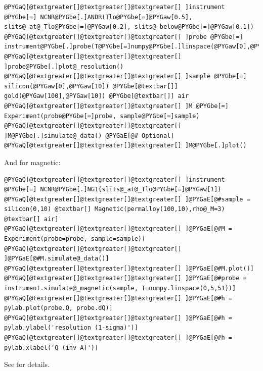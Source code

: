 \documentclass[letterpaper,10pt,english]{sphinxmanual}
\begin{document}
\begin{Verbatim}[commandchars=@\[\]]
@PYGaQ[@textgreater[]@textgreater[]@textgreater[] ]instrument @PYGbe[=] NCNR@PYGbe[.]ANDR(Tlo@PYGbe[=]@PYGaw[0.5], slits@_at@_Tlo@PYGbe[=]@PYGaw[0.2], slits@_below@PYGbe[=]@PYGaw[0.1])
@PYGaQ[@textgreater[]@textgreater[]@textgreater[] ]probe @PYGbe[=] instrument@PYGbe[.]probe(T@PYGbe[=]numpy@PYGbe[.]linspace(@PYGaw[0],@PYGaw[5],@PYGaw[51]))
@PYGaQ[@textgreater[]@textgreater[]@textgreater[] ]probe@PYGbe[.]plot@_resolution()
@PYGaQ[@textgreater[]@textgreater[]@textgreater[] ]sample @PYGbe[=] silicon(@PYGaw[0],@PYGaw[10]) @PYGbe[@textbar[]] gold(@PYGaw[100],@PYGaw[10]) @PYGbe[@textbar[]] air
@PYGaQ[@textgreater[]@textgreater[]@textgreater[] ]M @PYGbe[=] Experiment(probe@PYGbe[=]probe, sample@PYGbe[=]sample)
@PYGaQ[@textgreater[]@textgreater[]@textgreater[] ]M@PYGbe[.]simulate@_data() @PYGaE[@# Optional]
@PYGaQ[@textgreater[]@textgreater[]@textgreater[] ]M@PYGbe[.]plot()
\end{Verbatim}

And for magnetic:

\begin{Verbatim}[commandchars=@\[\]]
@PYGaQ[@textgreater[]@textgreater[]@textgreater[] ]instrument @PYGbe[=] NCNR@PYGbe[.]NG1(slits@_at@_Tlo@PYGbe[=]@PYGaw[1])
@PYGaQ[@textgreater[]@textgreater[]@textgreater[] ]@PYGaE[@#sample = silicon(0,10) @textbar[] Magnetic(permalloy(100,10),rho@_M=3) @textbar[] air]
@PYGaQ[@textgreater[]@textgreater[]@textgreater[] ]@PYGaE[@#M = Experiment(probe=probe, sample=sample)]
@PYGaQ[@textgreater[]@textgreater[]@textgreater[] ]@PYGaE[@#M.simulate@_data()]
@PYGaQ[@textgreater[]@textgreater[]@textgreater[] ]@PYGaE[@#M.plot()]
@PYGaQ[@textgreater[]@textgreater[]@textgreater[] ]@PYGaE[@#probe = instrument.simulate@_magnetic(sample, T=numpy.linspace(0,5,51))]
@PYGaQ[@textgreater[]@textgreater[]@textgreater[] ]@PYGaE[@#h = pylab.plot(probe.Q, probe.dQ)]
@PYGaQ[@textgreater[]@textgreater[]@textgreater[] ]@PYGaE[@#h = pylab.ylabel('resolution (1-sigma)')]
@PYGaQ[@textgreater[]@textgreater[]@textgreater[] ]@PYGaE[@#h = pylab.xlabel('Q (inv A)')]
\end{Verbatim}

See {\hyperref[api/instrument:module-refl1d.instrument]{}} for details.
\end{document}
